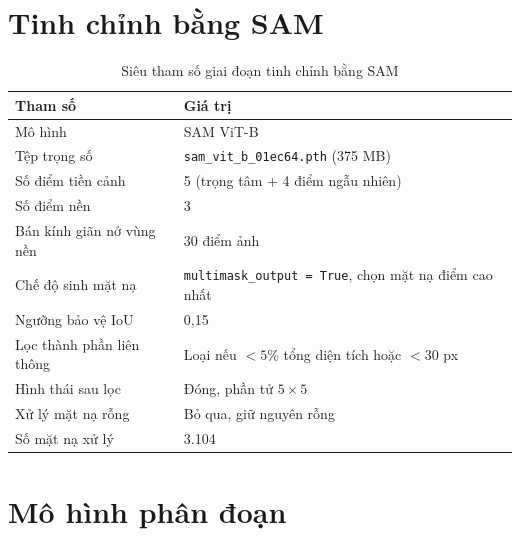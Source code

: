 \section{Tinh chỉnh bằng SAM}

\begin{table}[H]
\centering
\caption{Siêu tham số giai đoạn tinh chỉnh bằng SAM}
\label{tab:app_sam}
\begin{tabular}{L{5.6cm} L{7.4cm}}
\toprule
\textbf{Tham số} & \textbf{Giá trị} \\
\midrule
Mô hình              & SAM ViT-B \\
Tệp trọng số         & \texttt{sam\_\allowbreak vit\_\allowbreak b\_\allowbreak 01ec64.\allowbreak pth} (375 MB) \\
Số điểm tiền cảnh    & 5 (trọng tâm + 4 điểm ngẫu nhiên) \\
Số điểm nền          & 3 \\
Bán kính giãn nở vùng nền & 30 điểm ảnh \\
Chế độ sinh mặt nạ   & \texttt{multimask\_\allowbreak output = True}, chọn mặt nạ điểm cao nhất \\
Ngưỡng bảo vệ IoU    & 0,15 \\
Lọc thành phần liên thông & Loại nếu $< 5\%$ tổng diện tích hoặc $< 30$ px \\
Hình thái sau lọc    & Đóng, phần tử $5 \times 5$ \\
Xử lý mặt nạ rỗng    & Bỏ qua, giữ nguyên rỗng \\
Số mặt nạ xử lý      & 3.104 \\
\bottomrule
\end{tabular}
\end{table}

\section{Mô hình phân đoạn}

